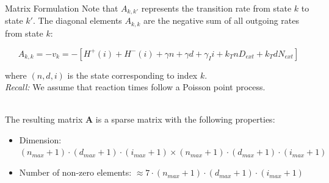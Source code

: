 \documentclass[aspectratio=169]{beamer}
\begin{document}
\begin{frame}{Matrix Formulation}
Note that $A_{k,k'}$ represents the transition rate from state $k$ to state $k'$. The diagonal elements $A_{k,k}$ are the negative sum of all outgoing rates from state $k$:

\[
A_{k,k} = -v_k =-[H^+(i) + H^-(i) + \gamma n + \gamma d + \gamma_I i + k_T n D_{ext} + k_T d N_{ext}]
\]

where $(n,d,i)$ is the state corresponding to index $k$.\\
\textit{Recall:} We assume that reaction times follow a Poisson point process.\\~\\

\pause

The resulting matrix $\mathbf{A}$ is a sparse matrix with the following properties:
\begin{itemize}
    \item Dimension: $(n_{max}+1) \cdot (d_{max}+1) \cdot (i_{max}+1) \times (n_{max}+1) \cdot (d_{max}+1) \cdot (i_{max}+1)$
    \item Number of non-zero elements: $\approx 7 \cdot (n_{max}+1) \cdot (d_{max}+1) \cdot (i_{max}+1)$
\end{itemize}
\end{frame}
\end{document}
